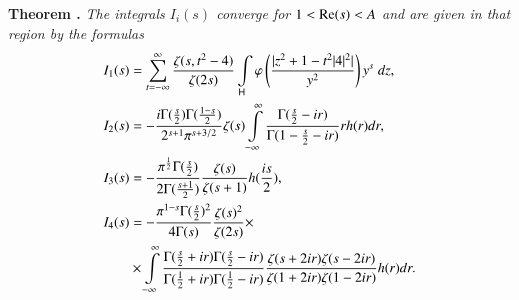 \medskip
\noindent
{\bfseries Theorem .\label{art11-thm2}} 
\textit{The integrals $I_i (s)$ converge for $1 < \operatorname{Re} (s) < A$ and are given in that region by the formulas}
\begin{align*}
I_1 (s) & = \sum\limits^\infty_{t = - \infty} \frac{\zeta(s, t^2 - 4)}{\zeta(2s)} \int\limits_{\mathsf{H}} \varphi 
\left(\frac{|z^2 + 1-t^2 |4|^2|}{y^2} \right) y^s \; dz,\\
I_2 (s) & = - \frac{i \Gamma (\frac{s}{2}) \Gamma (\frac{1-s}{2})}{2^{s+1} \pi^{s+3/2}} \zeta(s) \int\limits^\infty_{-\infty} \frac{\Gamma (\frac{s}{2}-ir)}{\Gamma (1-\frac{s}{2} -ir)} rh(r) dr,\\
I_3 (s)  & = - \frac{\pi^{\frac{1}{2}} \Gamma (\frac{s}{2})}{2 \Gamma (\frac{s+1}{2})} \frac{\zeta(s)}{\zeta(s+1)} h(\frac{is}{2}),\\
I_4 (s) & = - \frac{\pi^{1-s} \Gamma (\frac{s}{2})^2}{4 \Gamma (s)} \frac{\zeta(s)^2}{\zeta(2s)} \times \\
& \times \int\limits^\infty_{-\infty} \frac{\Gamma (\frac{s}{2} + ir) \Gamma (\frac{s}{2} - ir)}{\Gamma (\frac{1}{2} + ir) \Gamma (\frac{1}{2} - ir)} \frac{\zeta (s+ 2 ir) \zeta (s - 2 ir)}{\zeta (1+ 2 i r) \zeta (1-2 ir)} h (r) dr. 
\end{align*}\pageoriginale

